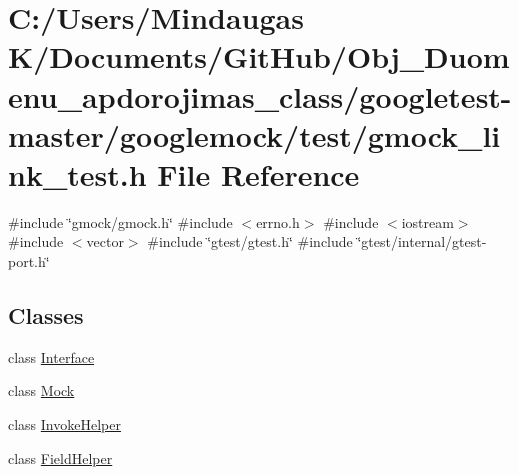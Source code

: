 \hypertarget{googletest-master_2googlemock_2test_2gmock__link__test_8h}{}\section{C\+:/\+Users/\+Mindaugas K/\+Documents/\+Git\+Hub/\+Obj\+\_\+\+Duomenu\+\_\+apdorojimas\+\_\+class/googletest-\/master/googlemock/test/gmock\+\_\+link\+\_\+test.h File Reference}
\label{googletest-master_2googlemock_2test_2gmock__link__test_8h}
{\ttfamily \#include \char`\"{}gmock/gmock.\+h\char`\"{}}\newline
{\ttfamily \#include $<$errno.\+h$>$}\newline
{\ttfamily \#include $<$iostream$>$}\newline
{\ttfamily \#include $<$vector$>$}\newline
{\ttfamily \#include \char`\"{}gtest/gtest.\+h\char`\"{}}\newline
{\ttfamily \#include \char`\"{}gtest/internal/gtest-\/port.\+h\char`\"{}}\newline
\subsection*{Classes}
\begin{DoxyCompactItemize}
\item 
class \mbox{\hyperlink{class_interface}{Interface}}
\item 
class \mbox{\hyperlink{class_mock}{Mock}}
\item 
class \mbox{\hyperlink{class_invoke_helper}{Invoke\+Helper}}
\item 
class \mbox{\hyperlink{class_field_helper}{Field\+Helper}}
\end{DoxyCompactItemize}
